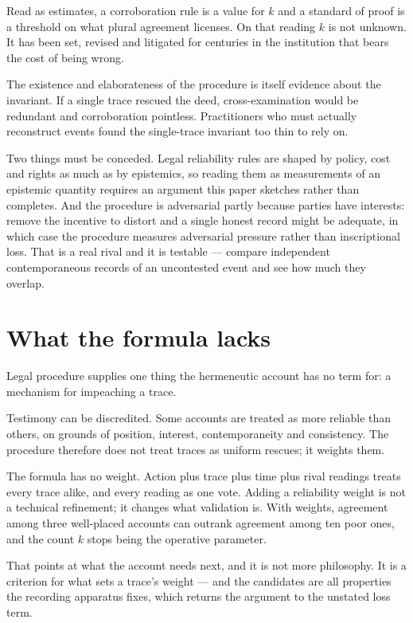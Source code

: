\documentclass[11pt,a4paper]{article}
\begin{document}
Read as estimates, a corroboration rule is a value for $k$ and a standard of proof is a threshold on what plural agreement licenses. On that reading $k$ is not unknown. It has been set, revised and litigated for centuries in the institution that bears the cost of being wrong.

The existence and elaborateness of the procedure is itself evidence about the invariant. If a single trace rescued the deed, cross-examination would be redundant and corroboration pointless. Practitioners who must actually reconstruct events found the single-trace invariant too thin to rely on.

Two things must be conceded. Legal reliability rules are shaped by policy, cost and rights as much as by epistemics, so reading them as measurements of an epistemic quantity requires an argument this paper sketches rather than completes. And the procedure is adversarial partly because parties have interests: remove the incentive to distort and a single honest record might be adequate, in which case the procedure measures adversarial pressure rather than inscriptional loss. That is a real rival and it is testable --- compare independent contemporaneous records of an uncontested event and see how much they overlap.

\section{What the formula lacks}
Legal procedure supplies one thing the hermeneutic account has no term for: a mechanism for impeaching a trace.

Testimony can be discredited. Some accounts are treated as more reliable than others, on grounds of position, interest, contemporaneity and consistency. The procedure therefore does not treat traces as uniform rescues; it weights them.

The formula has no weight. Action plus trace plus time plus rival readings treats every trace alike, and every reading as one vote. Adding a reliability weight is not a technical refinement; it changes what validation is. With weights, agreement among three well-placed accounts can outrank agreement among ten poor ones, and the count $k$ stops being the operative parameter.

That points at what the account needs next, and it is not more philosophy. It is a criterion for what sets a trace's weight --- and the candidates are all properties the recording apparatus fixes, which returns the argument to the unstated loss term.
\end{document}

